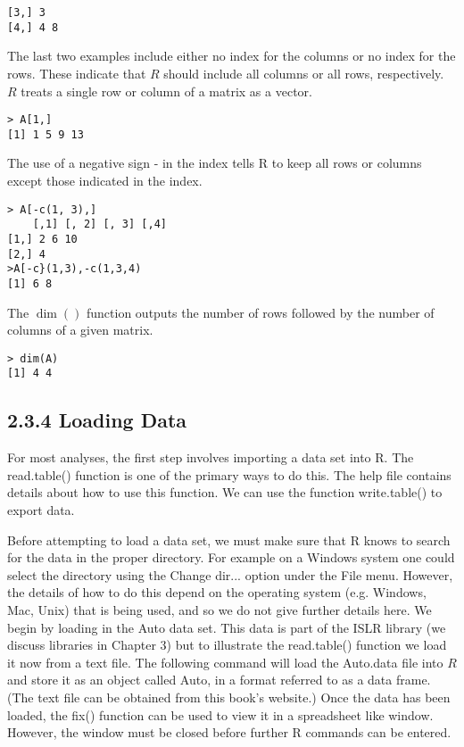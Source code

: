 \documentclass[10pt]{article}
\begin{document}
\begin{verbatim}
[3,] 3
[4,] 4 8
\end{verbatim}

The last two examples include either no index for the columns or no index for the rows. These indicate that $R$ should include all columns or all rows, respectively. $R$ treats a single row or column of a matrix as a vector.

\begin{verbatim}
> A[1,]
[1] 1 5 9 13
\end{verbatim}

The use of a negative sign - in the index tells R to keep all rows or columns except those indicated in the index.

\begin{verbatim}
> A[-c(1, 3),]
    [,1] [, 2] [, 3] [,4]
[1,] 2 6 10
[2,] 4
>A[-c}(1,3),-c(1,3,4)
[1] 6 8
\end{verbatim}

The $\operatorname{dim}()$ function outputs the number of rows followed by the number of columns of a given matrix.

\begin{verbatim}
> dim(A)
[1] 4 4
\end{verbatim}

\subsection*{2.3.4 Loading Data}
For most analyses, the first step involves importing a data set into R. The read.table() function is one of the primary ways to do this. The help file contains details about how to use this function. We can use the function write.table() to export data.

Before attempting to load a data set, we must make sure that R knows to search for the data in the proper directory. For example on a Windows system one could select the directory using the Change dir... option under the File menu. However, the details of how to do this depend on the operating system (e.g. Windows, Mac, Unix) that is being used, and so we do not give further details here. We begin by loading in the Auto data set. This data is part of the ISLR library (we discuss libraries in Chapter 3) but to illustrate the read.table() function we load it now from a text file. The following command will load the Auto.data file into $R$ and store it as an object called Auto, in a format referred to as a data frame. (The text file can be obtained from this book's website.) Once the data has been loaded, the fix() function can be used to view it in a spreadsheet like window. However, the window must be closed before further R commands can be entered.
\end{document}
